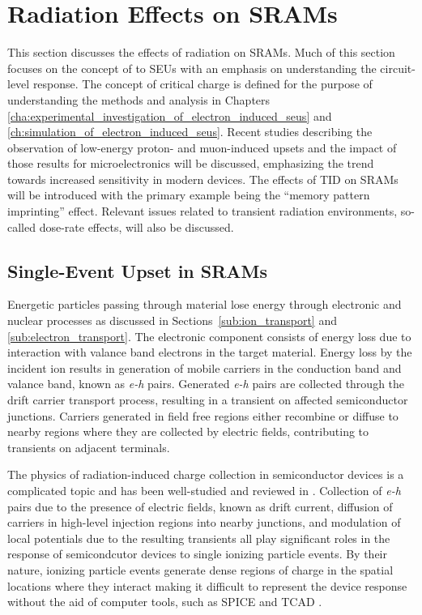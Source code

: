 \section{Radiation Effects on SRAMs} %
\label{sec:radiation_effects_on_sram}
This section discusses the effects of radiation on SRAMs. 
Much of this section focuses on the concept of to SEUs with an emphasis on understanding the circuit-level response.
The concept of critical charge is defined for the purpose of understanding the methods and analysis in Chapters \ref{cha:experimental_investigation_of_electron_induced_seus} and \ref{ch:simulation_of_electron_induced_seus}.
Recent studies describing the observation of low-energy proton- and muon-induced upsets and the impact of those results for microelectronics will be discussed, emphasizing the trend towards increased sensitivity in modern devices. 
The effects of TID on SRAMs will be introduced with the primary example being the ``memory pattern imprinting'' effect. 
Relevant issues related to transient radiation environments, so-called dose-rate effects, will also be discussed.

\subsection{Single-Event Upset in SRAMs} %
\label{sub:single_event_upset_in_srams}
Energetic particles passing through material lose energy through electronic and nuclear processes as discussed in Sections~\ref{sub:ion_transport} and \ref{sub:electron_transport}. 
The electronic component consists of energy loss due to interaction with valance band electrons in the target material. 
Energy loss by the incident ion results in generation of mobile carriers in the conduction band and valance band, known as \emph{e-h} pairs.
Generated \emph{e-h} pairs are collected through the drift carrier transport process, resulting in a transient on affected semiconductor junctions.
Carriers generated in field free regions either recombine or diffuse to nearby regions where they are collected by electric fields, contributing to transients on adjacent terminals.

The physics of radiation-induced charge collection in semiconductor devices is a complicated topic and has been well-studied and reviewed in \cite{mclean1982charge,oldham1983charge,oldham1986revised,dodd1994three,edmonds1997charge,edmonds1998electric,hubert2000study,edmonds2010theoretical,edmonds2011proposed,edmonds2011theoretical,edmonds2011extension,hooten2012significance}.
Collection of \emph{e-h} pairs due to the presence of electric fields, known as drift current, diffusion of carriers in high-level injection regions into nearby junctions, and modulation of local potentials due to the resulting transients all play significant roles in the response of semicondcutor devices to single ionizing particle events.
By their nature, ionizing particle events generate dense regions of charge in the spatial locations where they interact making it difficult to represent the device response without the aid of computer tools, such as SPICE \cite{gadlage2004single,kauppila2009bias,massengill:1993sc} and TCAD \cite{dodd1994three,dasgupta2007effect,massengill:1993sc}.

